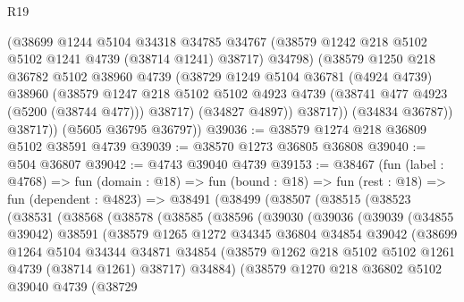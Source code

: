 \begin{lexlean}{R19}
\begin{coremodule}
{{{{{{{{{{{              (@38699
                @1244
                @5104
                @34318
                @34785
                @34767
                (@38579 @1242 @218 @5102 @5102 @1241 @4739 (@38714 @1241) @38717)
                @34798)
              (@38579
                @1250
                @218
                @36782
                @5102
                @38960
                @4739
                (@38729
                  @1249
                  @5104
                  @36781
                  (@4924 @4739)
                  @38960
                  (@38579
                    @1247
                    @218
                    @5102
                    @5102
                    @4923
                    @4739
                    (@38741 @477 @4923 (@5200 (@38744 @477)))
                    @38717)
                  (@34827 @4897))
                @38717))
            (@34834 @36787))
          @38717))
      (@5605 @36795 @36797))
@39036 := @38579 @1274 @218 @36809 @5102 @38591 @4739
@39039 := @38570 @1273 @36805 @36808
@39040 := @504 @36807
@39042 := @4743 @39040 @4739
@39153 := @38467
    (fun (label : @4768) =>
    fun (domain : @18) =>
    fun (bound : @18) =>
    fun (rest : @18) =>
    fun (dependent : @4823) =>
    @38491
      (@38499
        (@38507
          (@38515
            (@38523
              (@38531
                (@38568
                  (@38578
                    (@38585
                      (@38596
                        (@39030
                          (@39036
                            (@39039
                              (@34855 @39042)
                              @38591
                              (@38579
                                @1265
                                @1272
                                @34345
                                @36804
                                @34854
                                @39042
                                (@38699
                                  @1264
                                  @5104
                                  @34344
                                  @34871
                                  @34854
                                  (@38579 @1262 @218 @5102 @5102 @1261 @4739 (@38714 @1261) @38717)
                                  @34884)
                                (@38579
                                  @1270
                                  @218
                                  @36802
                                  @5102
                                  @39040
                                  @4739
                                  (@38729
}}}}}}}}}}}
\end{coremodule}
\end{lexlean}
